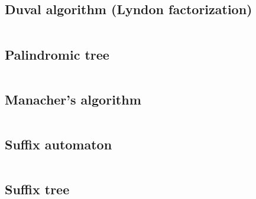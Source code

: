 \documentclass{article}
\begin{document}
\subsection{Duval algorithm (Lyndon factorization)}
\inputminted[mathescape, breaklines, breakafter=(, tabsize=2, frame=lines, showtabs, tab=|\ , tabcolor=lightgray]{c++}{./strings/duval/duval.cpp}
\subsection{Palindromic tree}
\inputminted[mathescape, breaklines, breakafter=(, tabsize=2, frame=lines, showtabs, tab=|\ , tabcolor=lightgray]{c++}{./strings/eertree/eertree.cpp}
\subsection{Manacher's algorithm}
\inputminted[mathescape, breaklines, breakafter=(, tabsize=2, frame=lines, showtabs, tab=|\ , tabcolor=lightgray]{c++}{./strings/manacher/manacher.cpp}
\subsection{Suffix automaton}
\inputminted[mathescape, breaklines, breakafter=(, tabsize=2, frame=lines, showtabs, tab=|\ , tabcolor=lightgray]{c++}{./strings/suff-automaton/suff-automaton.cpp}
\subsection{Suffix tree}
\inputminted[mathescape, breaklines, breakafter=(, tabsize=2, frame=lines, showtabs, tab=|\ , tabcolor=lightgray]{c++}{./strings/suff-tree/suff-tree.cpp}


\onecolumn


\end{document}
